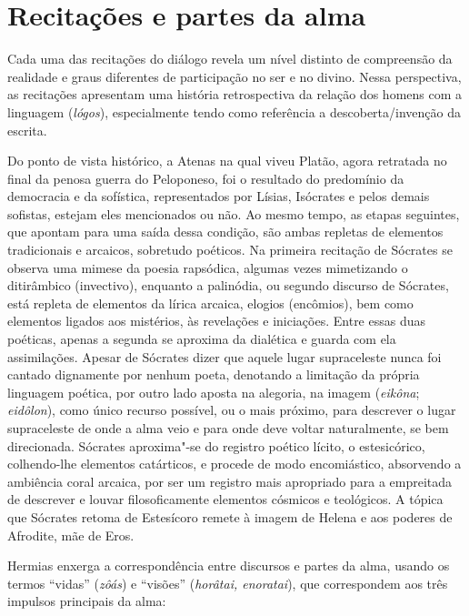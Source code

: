  

\section{Recitações e partes da alma}
	

Cada uma das recitações do diálogo revela um nível distinto de
compreensão da realidade e graus diferentes de participação no ser e no
divino. Nessa perspectiva, as recitações apresentam uma história
retrospectiva da relação dos homens com a linguagem (\emph{lógos}),
especialmente tendo como referência a descoberta/\allowbreak{}invenção da escrita.

Do ponto de vista histórico, a Atenas na qual viveu Platão, agora
retratada no final da penosa guerra do Peloponeso, foi o resultado do
predomínio da democracia e da sofística, representados por Lísias,
Isócrates e pelos demais sofistas, estejam eles mencionados ou não. Ao
mesmo tempo, as etapas seguintes, que apontam para uma saída dessa
condição, são ambas repletas de elementos tradicionais e arcaicos,
sobretudo poéticos. Na primeira recitação de Sócrates se observa uma
mimese da poesia rapsódica, algumas vezes mimetizando o ditirâmbico
(invectivo), enquanto a palinódia, ou segundo discurso de Sócrates, está
repleta de elementos da lírica arcaica, elogios (encômios), bem como
elementos ligados aos mistérios, às revelações e iniciações. Entre essas
duas poéticas, apenas a segunda se aproxima da dialética e guarda com
ela assimilações. Apesar de Sócrates dizer que aquele lugar supraceleste
nunca foi cantado dignamente por nenhum poeta, denotando a limitação da
própria linguagem poética, por outro lado aposta na alegoria, na imagem
(\emph{eikôna}; \emph{eidôlon}), como único recurso possível, ou o mais
próximo, para descrever o lugar supraceleste de onde a alma veio e para
onde deve voltar naturalmente, se bem direcionada. Sócrates aproxima"-se
do registro poético lícito, o estesicórico, colhendo-lhe elementos
catárticos, e procede de modo encomiástico, absorvendo a ambiência
coral arcaica, por ser um registro mais apropriado para a empreitada de
descrever e louvar filosoficamente elementos cósmicos e teológicos. 
A tópica que Sócrates retoma de Estesícoro remete à imagem de Helena e aos
poderes de Afrodite, mãe de Eros.

Hermias enxerga a correspondência entre discursos e partes da alma,
usando os termos ``vidas'' (\emph{zôás}) e ``visões'' (\emph{horâtai,
enoratai}), que correspondem aos três impulsos principais da alma:

